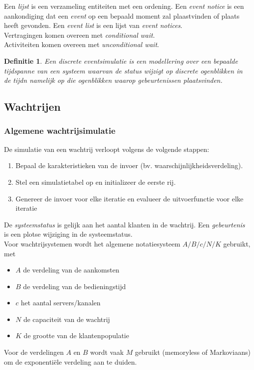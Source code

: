 \documentclass{article}
\newtheorem{mydef}{Definitie}
\begin{document}
	Een \textit{lijst} is een verzameling entiteiten met een ordening. Een \textit{event notice} is een aankondiging dat een \textit{event} op een bepaald moment zal plaastvinden of plaats heeft gevonden. Een \textit{event list} is een lijst van \textit{event notices}.\\

	Vertragingen komen overeen met \textit{conditional wait}.\\
	Activiteiten komen overeen met \textit{unconditional wait}.
	
	\begin{mydef}
		Een discrete eventsimulatie is een modellering over een bepaalde tijdspanne van een systeem waarvan de status wijzigt op discrete ogenblikken in de tijdn namelijk op die ogenblikken waarop gebeurtenissen plaatsvinden.
	\end{mydef}
	
	\subsection{Wachtrijen}
	
	\subsubsection{Algemene wachtrijsimulatie}
	
	De simulatie van een wachtrij verloopt volgens de volgende stappen:
	
	\begin{enumerate}
		\item Bepaal de karakteristieken van de invoer (bv. waarschijnlijkheidsverdeling).
		\item Stel een simulatietabel op en initializeer de eerste rij.
		\item Genereer de invoer voor elke iteratie en evalueer de uitvoerfunctie voor elke iteratie
	\end{enumerate}

	De \textit{systeemstatus} is gelijk aan het aantal klanten in de wachtrij. Een \textit{gebeurtenis} is een plotse wijziging in de systeemstatus. \\
	
	Voor wachtrijsystemen wordt het algemene notatiesysteem $A/B/c/N/K$ gebruikt, met
	\begin{itemize}
		\item $A$ de verdeling van de aankomsten
		\item $B$ de verdeling van de bedieningstijd
		\item $c$ het aantal servers/kanalen
		\item $N$ de capaciteit van de wachtrij
		\item $K$ de grootte van de klantenpopulatie
	\end{itemize}
	Voor de verdelingen $A$ en $B$ wordt vaak $M$ gebruikt (memoryless of Markoviaans) om de exponentiële verdeling aan te duiden.\\
\end{document}
